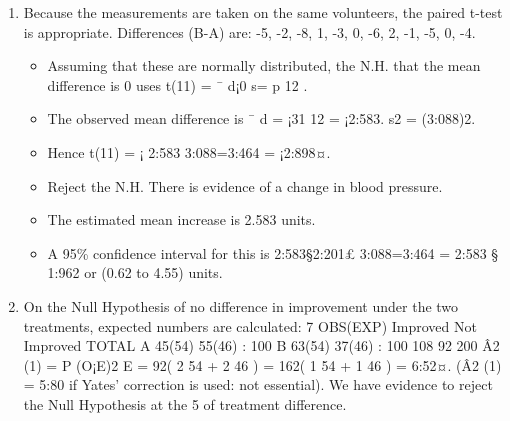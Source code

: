 \documentclass[a4paper,12pt]{article}
\begin{document}
\begin{enumerate}
\item Because the measurements are taken on the same volunteers, the paired t-test is appropriate.
Differences (B-A) are: -5, -2, -8, 1, -3, 0, -6, 2, -1, -5, 0, -4.
\begin{itemize}
\item Assuming that these are normally distributed, the N.H. that the mean difference is 0
uses t(11) = ¯ d¡0
s=
p
12
.
\item The observed mean difference is ¯ d = ¡31
12 = ¡2:583. s2 = (3:088)2.
\item Hence t(11) = ¡ 2:583
3:088=3:464 = ¡2:898¤.

    \item Reject the N.H. There is evidence of a change in blood pressure.
\item The estimated mean increase is 2.583 units. 
\item A 95\% confidence interval for this is 2:583§2:201£
3:088=3:464 = 2:583 § 1:962 or (0.62 to 4.55) units.
\end{itemize}

\item On the Null Hypothesis of no difference in improvement under the two treatments, expected
numbers are calculated:
7
OBS(EXP) Improved Not Improved TOTAL
A 45(54) 55(46) : 100
B 63(54) 37(46) : 100
108 92 200
Â2
(1) =
P (O¡E)2
E = 92( 2
54 + 2
46 ) = 162( 1
54 + 1
46 ) = 6:52¤.
(Â2
(1) = 5:80 if Yates’ correction is used: not essential).
We have evidence to reject the Null Hypothesis at the 5%
of treatment difference.\end{enumerate}
\end{document}
